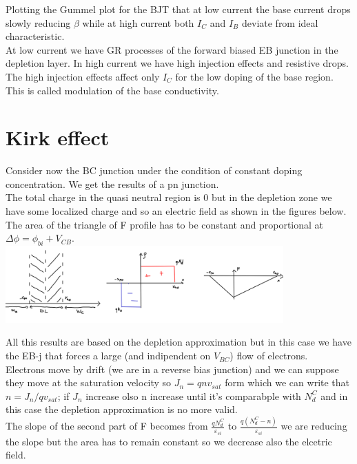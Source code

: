 Plotting the Gummel plot for the BJT that at low current the base current drops slowly reducing $\beta$ while at high current both $I_C$ and $I_B$ deviate from ideal characteristic.\\
\vspace{3mm}
At low current we have GR processes of the forward biased EB junction in the depletion layer.
\vspace{3mm}
In high current we have high injection effects and resistive drops. The high injection effects affect only $I_C$ for the low doping of the base region. This is called modulation of the base conductivity.\\

\section{Kirk effect}
Consider now the BC junction under the condition of constant doping concentration. We get the results of a pn junction.\\
The total charge in the quasi neutral region is 0 but in the depletion zone we have some localized charge and so an electric field as shown in the figures below.\\
The area of the triangle of F profile has to be constant and proportional at $\Delta \phi=\phi_{bi}+V_{CB}$.\\

\centering
\includegraphics[width=0.8\textwidth]{bjt9.png}\\
\raggedright

All this results are based on the depletion approximation but in this case we have the EB-j that forces a large (and indipendent on $V_{BC}$) flow of electrons.\\
Electrons move by drift (we are in a reverse bias junction) and we can suppose they move at the saturation velocity so $J_n=qnv_{sat}$ form which we can write that $n=J_n/qv_{sat}$; if $J_n$ increase olso n increase until it's comparabple with $N_d^C$ and in this case the depletion approximation is no more valid.\\
The slope of the second part of F becomes from $\frac{qN_d^C}{\varepsilon_{si}}$ to $\frac{q(N_d^C-n)}{\varepsilon_{si}}$ we are reducing the slope but the area has to remain constant so we decrease also the elcetric field.\\

